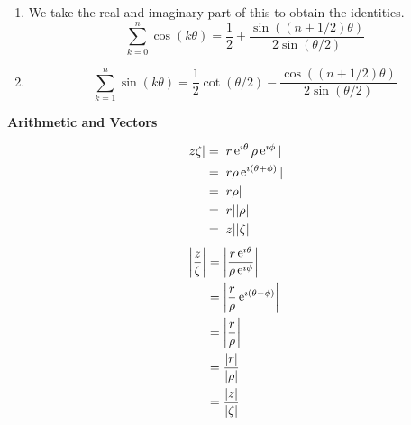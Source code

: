 {\begin{Solution}
  \begin{enumerate}
  \item
    We take the real and imaginary part of this to obtain the identities.
    \[
    \boxed{
      \sum_{k = 0}^n \cos(k \theta) =
      \frac{1}{2} + \frac{ \sin((n + 1/2) \theta) }
      { 2 \sin(\theta/2) }
      }
    \]
  \item
    \[
    \boxed{
      \sum_{k = 1}^n \sin(k \theta) =
      \frac{1}{2} \cot(\theta/2) 
      - \frac{ \cos((n+1/2) \theta ) }{ 2 \sin(\theta/2) }
      }
    \]
  \end{enumerate}
\end{Solution}







\begin{large}
  \noindent
  \textbf{Arithmetic and Vectors}
\end{large}







\begin{Solution}
  \label{solution modulus identities polar}
  \begin{align*}
    |z \zeta| &= |r \mathop{\mathrm{e}}\nolimits^{\imath \theta} \rho \mathop{\mathrm{e}}\nolimits^{\imath \phi} | 
    \\
    &= | r \rho \mathop{\mathrm{e}}\nolimits^{\imath \left( \theta + \phi \right)} | 
    \\
    &= |r \rho| 
    \\
    &= |r| |\rho| 
    \\
    &= |z| |\zeta|
  \end{align*}
  \begin{align*}
    \left| \frac{z}{\zeta} \right|
    &= \left| \frac{r \mathop{\mathrm{e}}\nolimits^{\imath \theta}}{\rho \mathop{\mathrm{e}}\nolimits^{\imath \phi}} \right| 
    \\
    &= \left| \frac{r}{\rho} \mathop{\mathrm{e}}\nolimits^{\imath \left( \theta - \phi \right)} \right| 
    \\
    &= \left| \frac{r}{\rho} \right| 
    \\
    &= \frac{|r|}{|\rho|} 
    \\
    &= \frac{|z|}{|\zeta|}
  \end{align*}
\end{Solution}









}
